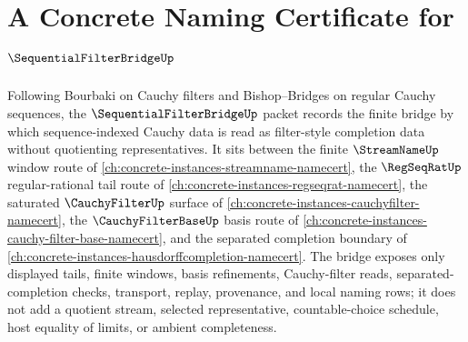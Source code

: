 \chapter{A Concrete Naming Certificate for $\SequentialFilterBridgeUp$}
\label{ch:concrete-instances-sequential-filter-bridge-namecert}

Following Bourbaki on Cauchy filters and Bishop--Bridges on regular Cauchy sequences, the $\SequentialFilterBridgeUp$ packet records the finite bridge by which sequence-indexed Cauchy data is read as filter-style completion data without quotienting representatives. It sits between the finite $\StreamNameUp$ window route of \autoref{ch:concrete-instances-streamname-namecert}, the $\RegSeqRatUp$ regular-rational tail route of \autoref{ch:concrete-instances-regseqrat-namecert}, the saturated $\CauchyFilterUp$ surface of \autoref{ch:concrete-instances-cauchyfilter-namecert}, the $\CauchyFilterBaseUp$ basis route of \autoref{ch:concrete-instances-cauchy-filter-base-namecert}, and the separated completion boundary of \autoref{ch:concrete-instances-hausdorffcompletion-namecert}. The bridge exposes only displayed tails, finite windows, basis refinements, Cauchy-filter reads, separated-completion checks, transport, replay, provenance, and local naming rows; it does not add a quotient stream, selected representative, countable-choice schedule, host equality of limits, or ambient completeness.

